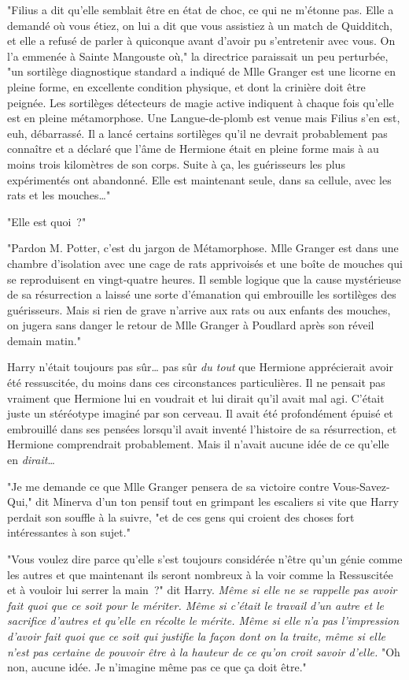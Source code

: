 "Filius a dit qu'elle semblait être en état de choc, ce qui ne m'étonne pas. Elle a demandé où vous étiez, on lui a dit que vous assistiez à un match de Quidditch, et elle a refusé de parler à quiconque avant d'avoir pu s'entretenir avec vous. On l'a emmenée à Sainte Mangouste où," la directrice paraissait un peu perturbée, "un sortilège diagnostique standard a indiqué de Mlle Granger est une licorne en pleine forme, en excellente condition physique, et dont la crinière doit être peignée. Les sortilèges détecteurs de magie active indiquent à chaque fois qu'elle est en pleine métamorphose. Une Langue-de-plomb est venue mais Filius s'en est, euh, débarrassé. Il a lancé certains sortilèges qu'il ne devrait probablement pas connaître et a déclaré que l'âme de Hermione était en pleine forme mais à au moins trois kilomètres de son corps. Suite à ça, les guérisseurs les plus expérimentés ont abandonné. Elle est maintenant seule, dans sa cellule, avec les rats et les mouches…"

"Elle est quoi~?"

"Pardon M. Potter, c'est du jargon de Métamorphose. Mlle Granger est dans une chambre d'isolation avec une cage de rats apprivoisés et une boîte de mouches qui se reproduisent en vingt-quatre heures. Il semble logique que la cause mystérieuse de sa résurrection a laissé une sorte d'émanation qui embrouille les sortilèges des guérisseurs. Mais si rien de grave n'arrive aux rats ou aux enfants des mouches, on jugera sans danger le retour de Mlle Granger à Poudlard après son réveil demain matin."

Harry n'était toujours pas sûr… pas sûr \emph{du tout} que Hermione apprécierait avoir été ressuscitée, du moins dans ces circonstances particulières. Il ne pensait pas vraiment que Hermione lui en voudrait et lui dirait qu'il avait mal agi. C'était juste un stéréotype imaginé par son cerveau. Il avait été profondément épuisé et embrouillé dans ses pensées lorsqu'il avait inventé l'histoire de sa résurrection, et Hermione comprendrait probablement. Mais il n'avait aucune idée de ce qu'elle en \emph{dirait}…

"Je me demande ce que Mlle Granger pensera de sa victoire contre Vous-Savez-Qui," dit Minerva d'un ton pensif tout en grimpant les escaliers si vite que Harry perdait son souffle à la suivre, "et de ces gens qui croient des choses fort intéressantes à son sujet."

"Vous voulez dire parce qu'elle s'est toujours considérée n'être qu'un génie comme les autres et que maintenant ils seront nombreux à la voir comme la Ressuscitée et à vouloir lui serrer la main~?" dit Harry. \emph{Même si elle ne se rappelle pas avoir fait quoi que ce soit pour le mériter. Même si c'était le travail d'un autre et le sacrifice d'autres et qu'elle en récolte le mérite. Même si elle n'a pas l'impression d'avoir fait quoi que ce soit qui justifie la façon dont on la traite, même si elle n'est pas certaine de pouvoir être à la hauteur de ce qu'on croit savoir d'elle.} "Oh non, aucune idée. Je n'imagine même pas ce que ça doit être."

